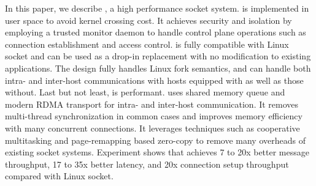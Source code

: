 In this paper, we describe \sys{}, a high performance socket system. \sys{} is implemented in user space to avoid kernel crossing cost. 
It achieves security and isolation by employing a trusted monitor daemon to handle control plane operations such as connection establishment and access control. 
\sys{} is fully compatible with Linux socket and can be used as a drop-in replacement with no modification to existing applications. The design fully
handles Linux fork semantics, and can handle both intra- and inter-host communications with hosts equipped with \sys{} as well as those without. 
Last but not least, \sys{} is performant. \sys{} uses shared memory queue and modern RDMA transport for intra- and inter-host communication.
It removes multi-thread synchronization in common cases and improves memory efficiency with many concurrent connections.
It leverages techniques such as cooperative multitasking and page-remapping based zero-copy to remove many overheads of existing socket systems.
Experiment shows that \sys achieves 7 to 20x better message throughput, 17 to 35x better latency, and 20x connection setup throughput compared with Linux socket.

